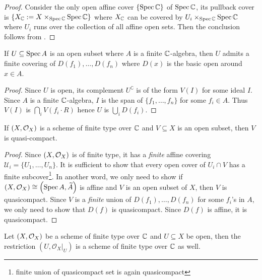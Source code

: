 \begin{proof}
  Consider the only open affine cover $\{\operatorname{Spec} \mathbb{C}\}$ of $\operatorname{Spec} \mathbb{C}$, its pullback cover is $\{X_{\mathbb{C}} := X \times_{\operatorname{Spec}\mathbb{C}} \operatorname{Spec}\mathbb{C}\}$ where $X_{\mathbb{C}}$ can be covered by $U_{i}\times_{\operatorname{Spec} \mathbb{C}}\operatorname{Spec} \mathbb{C}$ where $U_{i}$ runs over the collection of all affine open sets.
  Then the conclusion follows from .

\end{proof}

\begin{lemma} If $U \subseteq \operatorname{Spec} A$ is an open subset where $A$ is a finite $\mathbb{C}$-algebra, then $U$ admits a finite covering of $D(f_{1}),\dots, D(f_{n})$ where $D(x)$ is the basic open around $x \in A$.
\end{lemma}
\begin{proof}
  Since $U$ is open, its complement $U^{\complement}$ is of the form $V(I)$ for some ideal $I$. Since $A$ is a finite $\mathbb{C}$-algebra, $I$ is the span of $\{f_{1},\dots, f_{n}\}$ for some $f_{i} \in A$. Thus $V(I)$ is $\bigcap_{i}V(f_{i}\cdot R)$ hence $U$ is $\bigcup_{i}D(f_{i})$.
\end{proof}

\begin{lemma}
   If $\left(X, \mathcal{O}_{X}\right)$ is a scheme of finite type over $\mathbb{C}$ and $V \subseteq X$ is an open subset, then $V$ is quasi-compact.
\end{lemma}
\begin{proof}
  Since $\left(X, \mathcal{O}_{X}\right)$ is of finite type, it has a {\em\/ finite} affine covering $\mathcal{U}_{i} = \{U_{1},\dots, U_{n}\}$.
  It is sufficient to show that every open cover of $U_{i} \cap V$ has a finite subcover\footnote{finite union of quasicompact set is again quasicompact}. In another word, we only need to show if $\left(X, \mathcal{O}_{X}\right) \cong \left(\operatorname*{Spec}{A}, \widetilde{A}\right)$ is affine and $V$ is an open subset of $X$, then $V$ is quasicompact. Since $V$ is a {\em finite\/} union of $D(f_{1}),\dots, D(f_{n})$ for some $f_{i}$'s in $A$, we only need to show that $D(f)$ is quasicompact. Since $D(f)$ is affine, it is quasicompact.
\end{proof}

\begin{corollary}
  Let $\left(X, \mathcal{O}_{X}\right)$ be a scheme of finite type over $\mathbb{C}$ and $U \subseteq X$ be open, then the restriction $(U, \mathcal{O}_{X}|_{U})$ is a scheme of finite type over $\mathbb{C}$ as well.
\end{corollary}

